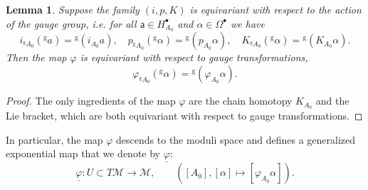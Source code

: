 \documentclass[11pt,a4paper]{amsart}
\theoremstyle{plain} %
\newtheorem{lem}[thm]{Lemma}
\theoremstyle{definition}
\theoremstyle{remark}
\newcommand{\sfa}{\mathsf{a}}
\newcommand{\M}{\mathcal{M}}
\newcommand{\sfg}{\mathrm{g}} %
\begin{document}
{\begin{lem} Suppose the family $(i,p,K)$ is equivariant with respect to the action of the gauge group, i.e. 
    for all $\sfa \in H^\bullet_{A_0}$ and $\alpha \in \Omega^\bullet$ we have 
    \begin{equation}
        i_{{}^\sfg A_0}({}^\sfg a) = {}^\sfg (i_{A_0}a), \quad 
        p_{{}^\sfg A_0}({}^\sfg \alpha) = {}^\sfg (p_{A_0}\alpha), 
        \quad K_{{}^\sfg A_0}({}^\sfg \alpha) = {}^\sfg (K_{A_0}\alpha).
    \end{equation}
Then the map $\varphi$ is equivariant with respect to gauge transformations, 
    \begin{equation}
        \varphi_{{}^\sfg A_0}({}^\sfg \alpha) = {}^\sfg (\varphi_{A_0}\alpha).
    \end{equation}
\end{lem}
\begin{proof}
    The only ingredients of the map $\varphi$ are the chain homotopy $K_{A_0}$ and the Lie bracket, which are both equivariant with respect to gauge transformations. 
\end{proof} 
In particular, the map $\varphi$ descends to the moduli space and defines a generalized exponential map that we denote by $\underline{\varphi}$: %
\begin{equation}\label{phi underline}
    \underline{\varphi} \colon U \subset T\M \to \M, \qquad ([A_0],[\alpha] \mapsto [\varphi_{A_0}\alpha]).
\end{equation}

}
\end{document}
